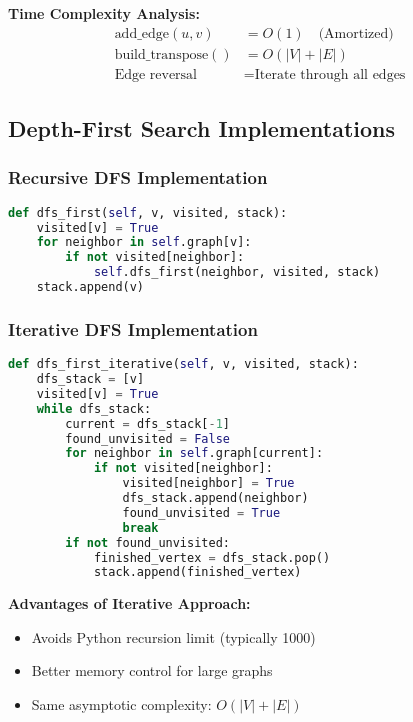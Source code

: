 \documentclass{book}
\theoremstyle{definition}
\begin{document}
\textbf{Time Complexity Analysis:}
\begin{align*}
\text{add\_edge}(u,v) &= O(1) \quad \text{(Amortized)} \\
\text{build\_transpose}() &= O(|V| + |E|) \\
\text{Edge reversal} &= \text{Iterate through all edges}
\end{align*}

\subsection{Depth-First Search Implementations}

\subsubsection{Recursive DFS Implementation}

\begin{lstlisting}[language=Python]
def dfs_first(self, v, visited, stack):
    visited[v] = True
    for neighbor in self.graph[v]:
        if not visited[neighbor]:
            self.dfs_first(neighbor, visited, stack)
    stack.append(v)
\end{lstlisting}

\subsubsection{Iterative DFS Implementation}

\begin{lstlisting}[language=Python]
def dfs_first_iterative(self, v, visited, stack):
    dfs_stack = [v]
    visited[v] = True
    while dfs_stack:
        current = dfs_stack[-1]
        found_unvisited = False
        for neighbor in self.graph[current]:
            if not visited[neighbor]:
                visited[neighbor] = True
                dfs_stack.append(neighbor)
                found_unvisited = True
                break
        if not found_unvisited:
            finished_vertex = dfs_stack.pop()
            stack.append(finished_vertex)
\end{lstlisting}

\textbf{Advantages of Iterative Approach:}
\begin{itemize}
    \item Avoids Python recursion limit (typically 1000)
    \item Better memory control for large graphs
    \item Same asymptotic complexity: $O(|V| + |E|)$
\end{itemize}
\end{document}
